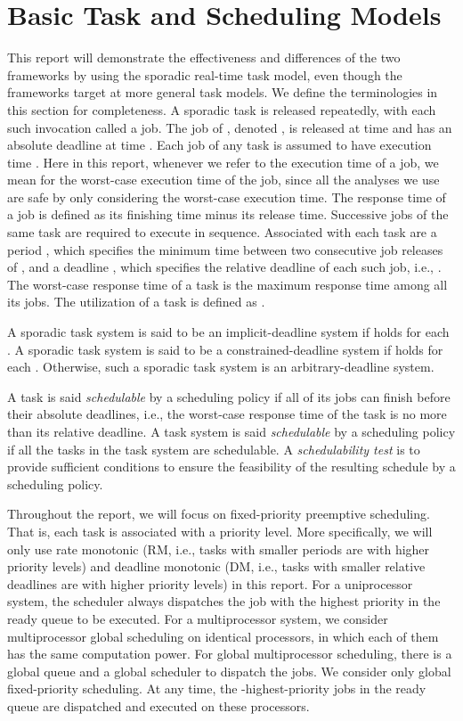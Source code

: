 \documentclass[10pt,conference]{IEEEtran}
\begin{document}
\section{Basic Task and Scheduling Models}
\label{sec:model}

This report will demonstrate the effectiveness and differences of the
two frameworks by using the sporadic real-time task model, even though
the frameworks target at more general task models. We define the
terminologies in this section for completeness.  A sporadic task
 is released repeatedly, with each such invocation called a
job. The  job of , denoted , is released
at time  and has an absolute deadline at time . Each
job of any task  is assumed to have execution time . Here
in this report, whenever we refer to the execution time of a job, we
mean for the worst-case execution time of the job, since all the analyses we use are safe by only considering 
the worst-case execution time.  The response time
of a job is defined as its finishing time minus its release
time. Successive jobs of the same task are required to execute in
sequence. Associated with each task  are a period , which
specifies the minimum time between two consecutive job releases of
, and a deadline , which specifies the relative deadline
of each such job, i.e., . The worst-case response
time of a task  is the maximum response time among all its
jobs.  The utilization of a task  is defined as .



A sporadic task system  is said to be an implicit-deadline
system if  holds for each . A sporadic task system
 is said to be a constrained-deadline system if 
holds for each .  Otherwise, such a sporadic task system
 is an arbitrary-deadline system.

A task is said \emph{schedulable} by a scheduling policy if all of its
jobs can finish before their absolute deadlines, i.e., the worst-case
response time of the task is no more than its relative deadline.  A
task system is said \emph{schedulable} by a scheduling policy if all
the tasks in the task system are schedulable. A \emph{schedulability
  test} is to provide sufficient conditions to ensure the feasibility
of the resulting schedule by a scheduling policy. 



Throughout the report, we will focus on fixed-priority preemptive
scheduling. That is, each task is associated with a priority
level. More specifically, we will only use rate monotonic (RM, i.e., 
tasks with smaller periods are with higher priority levels) and 
deadline monotonic (DM, i.e., 
tasks with smaller relative deadlines are with higher priority levels)
in this report.
For a uniprocessor system, the scheduler always dispatches the job
with the highest priority in the ready queue to be executed.  For a
multiprocessor system, we consider multiprocessor global scheduling on
 identical processors, in which each of them has the same
computation power. For global multiprocessor scheduling, there is a
global queue and a global scheduler to dispatch the jobs. We consider
only global fixed-priority scheduling. At any time, the
-highest-priority jobs in the ready queue are dispatched and
executed on these  processors.
\end{document}
